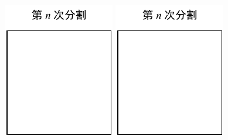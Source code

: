 \documentclass[10pt,a4paper]{ctexart}
\begin{document}
	\begin{figure}
		\includegraphics[width=\linewidth]{23/2014c}
		
		\includegraphics[width=\linewidth]{23/2014c}
	\end{figure}
	
\end{document}
